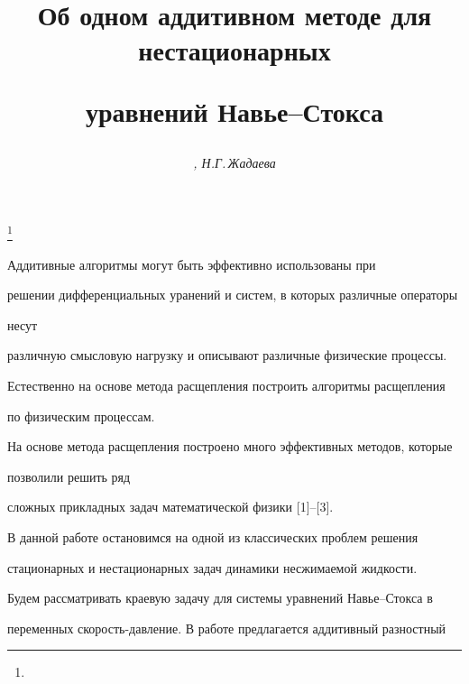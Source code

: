 \author{\it {}, Н.Г.\,Жадаева} 




\title{Об одном аддитивном методе для нестационарных


уравнений Навье--Стокса}


\thanks{}





\date{}




\pagestyle{plain} %







\maketitle


\label{begin}








Аддитивные алгоритмы могут быть эффективно использованы при


решении дифференциальных уранений и систем, в которых различные операторы


несут


различную смысловую нагрузку и описывают различные физические процессы.


Естественно на основе метода расщепления построить алгоритмы расщепления


по физическим процессам. 


На основе метода расщепления построено много эффективных методов, которые


позволили решить ряд


сложных прикладных задач математической физики [1]--[3].





В данной работе остановимся на одной из классических проблем решения


стационарных и нестационарных задач динамики несжимаемой жидкости.


Будем рассматривать краевую задачу для системы уравнений Навье--Стокса в


переменных скорость-давление. В работе предлагается аддитивный разностный


